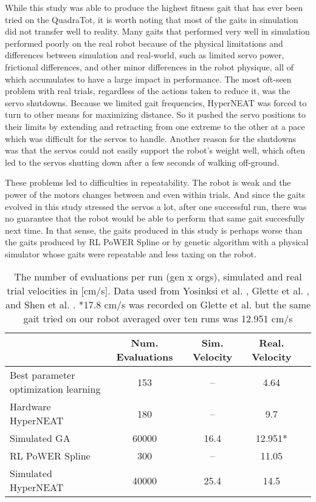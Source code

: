 While this study was able to produce the highest fitness gait that has ever been tried on the QuadraTot, it is worth noting that most of the gaits in simulation did not transfer well to reality. 
Many gaits that performed very well in simulation performed poorly on the real robot because of the physical limitations and differences between simulation and real-world, such as limited servo power, frictional differences, and other minor differences in the robot physique, all of which accumulates to have a large impact in performance.
The most oft-seen problem with real trials, regardless of the actions taken to reduce it, was the servo shutdowns. 
Because we limited gait frequencies, HyperNEAT was forced to turn to other means for maximizing distance. 
So it pushed the servo positions to their limits by extending and retracting from one extreme to the other at a pace which was difficult for the servos to handle. 
Another reason for the shutdowns was that the servos could not easily support the robot's weight well, which often led to the servos shutting down after a few seconds of walking off-ground. 

These problems led to difficulties in repeatability. 
The robot is weak and the power of the motors changes between and even within trials. 
And since the gaits evolved in this study stressed the servos a lot, after one successful run, there was no guarantee that the robot would be able to perform that same gait succesfully next time. 
In that sense, the gaits produced in this study is perhaps worse than the gaits produced by RL PoWER Spline \cite{haocheng} or by genetic algorithm with a physical simulator \cite{glette} whose gaits were repeatable and less taxing on the robot. 


\begin{table}
\caption{The number of evaluations per run (gen x orgs), simulated and real trial velocities in [cm/s]. Data used from Yosinksi et al. \cite{yos:clune}, Glette et al. \cite{glette}, and Shen et al. \cite{haocheng}.
*17.8 cm/s was recorded on Glette et al. \cite{glette} but the same gait tried on our robot averaged over ten runs was 12.951 cm/s}  %
\begin{center}
\begin{tabular}{|l|c|c|c|c|}
\hline
                                         & Num. Evaluations  & Sim. Velocity  & Real. Velocity \\
\hline
Best parameter optimization learning    &153    & --    & 4.64 \\
\hline
Hardware HyperNEAT                  & 180         & --         &   9.7     \\
\hline
Simulated GA              & 60000       & 16.4       &   12.951*     \\
\hline
RL PoWER Spline                          & 300         & --         &   11.05 \\
\hline
Simulated HyperNEAT                      & 40000       & 25.4       &   14.5 \\
\hline
\end{tabular}
\end{center}
\end{table}

